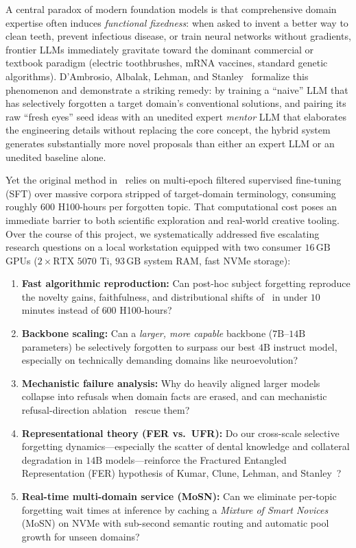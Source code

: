 \documentclass[10.5pt,letterpaper]{article}
\begin{document}
A central paradox of modern foundation models is that comprehensive domain expertise often induces \emph{functional fixedness}: when asked to invent a better way to clean teeth, prevent infectious disease, or train neural networks without gradients, frontier LLMs immediately gravitate toward the dominant commercial or textbook paradigm (electric toothbrushes, mRNA vaccines, standard genetic algorithms). D'Ambrosio, Albalak, Lehman, and Stanley~\cite{dambrosio2026value} formalize this phenomenon and demonstrate a striking remedy: by training a ``naive'' LLM that has selectively forgotten a target domain's conventional solutions, and pairing its raw ``fresh eyes'' seed ideas with an unedited expert \emph{mentor} LLM that elaborates the engineering details without replacing the core concept, the hybrid system generates substantially more novel proposals than either an expert LLM or an unedited baseline alone.

Yet the original method in~\cite{dambrosio2026value} relies on multi-epoch filtered supervised fine-tuning (SFT) over massive corpora stripped of target-domain terminology, consuming roughly $600$ H100-hours per forgotten topic. That computational cost poses an immediate barrier to both scientific exploration and real-world creative tooling. Over the course of this project, we systematically addressed five escalating research questions on a local workstation equipped with two consumer $16\,\text{GB}$ GPUs ($2\times\text{RTX~5070~Ti}$, $93\,\text{GB}$ system RAM, fast NVMe storage):

\begin{enumerate}
  \item \textbf{Fast algorithmic reproduction:} Can post-hoc subject forgetting reproduce the novelty gains, faithfulness, and distributional shifts of~\cite{dambrosio2026value} in under $10$ minutes instead of $600$ H100-hours?
  \item \textbf{Backbone scaling:} Can a \emph{larger, more capable} backbone ($7\text{B}$--$14\text{B}$ parameters) be selectively forgotten to surpass our best $4\text{B}$ instruct model, especially on technically demanding domains like neuroevolution?
  \item \textbf{Mechanistic failure analysis:} Why do heavily aligned larger models collapse into refusals when domain facts are erased, and can mechanistic refusal-direction ablation~\cite{arditi2024refusal} rescue them?
  \item \textbf{Representational theory (FER vs.\ UFR):} Do our cross-scale selective forgetting dynamics---especially the scatter of dental knowledge and collateral degradation in $14\text{B}$ models---reinforce the Fractured Entangled Representation (FER) hypothesis of Kumar, Clune, Lehman, and Stanley~\cite{kumar2025fer}?
  \item \textbf{Real-time multi-domain service (MoSN):} Can we eliminate per-topic forgetting wait times at inference by caching a \emph{Mixture of Smart Novices} (MoSN) on NVMe with sub-second semantic routing and automatic pool growth for unseen domains?
\end{enumerate}
\end{document}
